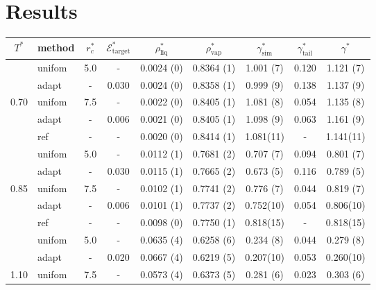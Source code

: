 \documentclass[aps,pre,preprint,unsortedaddress]{revtex4}
\begin{document}
\newpage




\section{Results}






\begin{table}
  \centering
  \begin{tabular*}{0.95\textwidth}{@{\extracolsep{\fill}}c|l|ccccccc}\hline\hline
    $T^\ast$ & \textrm{method} &$r^\ast_{c}$ & $\mathcal E^\ast_{\textrm{target}}$  & $\rho^\ast_{\textrm{liq}}$ & $\rho^\ast_{\textrm{vap}}$ & $\gamma^\ast_{\textrm{sim}}$ & $\gamma^\ast_{\textrm{tail}}$ & $\gamma^\ast$ \\\hline
    & \textrm{unifom} & 5.0     & -       & 0.0024 (0) & 0.8364 (1) & 1.001 (7) & 0.120 & 1.121 (7) \\
    & \textrm{adapt}  & -       & 0.030   & 0.0024 (0) & 0.8358 (1) & 0.999 (9) & 0.138 & 1.137 (9) \\
0.70& \textrm{unifom} & 7.5     & -       & 0.0022 (0) & 0.8405 (1) & 1.081 (8) & 0.054 & 1.135 (8) \\
    & \textrm{adapt}  & -       & 0.006   & 0.0021 (0) & 0.8405 (1) & 1.098 (9) & 0.063 & 1.161 (9) \\
    & \textrm{ref}    & -       & -       & 0.0020 (0) & 0.8414 (1) & 1.081(11) & -     & 1.141(11) \\    \hline
    & \textrm{unifom} & 5.0     & -       & 0.0112 (1) & 0.7681 (2) & 0.707 (7) & 0.094 & 0.801 (7) \\
    & \textrm{adapt}  & -       & 0.030   & 0.0115 (1) & 0.7665 (2) & 0.673 (5) & 0.116 & 0.789 (5) \\
0.85& \textrm{unifom} & 7.5     & -       & 0.0102 (1) & 0.7741 (2) & 0.776 (7) & 0.044 & 0.819 (7) \\
    & \textrm{adapt}  & -       & 0.006   & 0.0101 (1) & 0.7737 (2) & 0.752(10) & 0.054 & 0.806(10) \\
    & \textrm{ref}    & -       & -       & 0.0098 (0) & 0.7750 (1) & 0.818(15) & -     & 0.818(15) \\    \hline
    & \textrm{unifom} & 5.0     & -       & 0.0635 (4) & 0.6258 (6) & 0.234 (8) & 0.044 & 0.279 (8) \\
    & \textrm{adapt}  & -       & 0.020   & 0.0667 (4) & 0.6219 (5) & 0.207(10) & 0.053 & 0.260(10) \\
1.10& \textrm{unifom} & 7.5     & -       & 0.0573 (4) & 0.6373 (5) & 0.281 (6) & 0.023 & 0.303 (6) \\

\end{tabular*}
\end{table}
\end{document}
